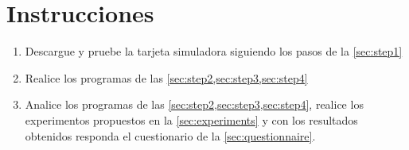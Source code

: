%
%


\section{Instrucciones}%
\label{sec:instructions}
\begin{enumerate}[noitemsep]
	\item Descargue y pruebe la tarjeta simuladora siguiendo los pasos de la \cref{sec:step1}
	\item Realice los programas de las \cref{sec:step2,sec:step3,sec:step4}
	\item Analice los programas de las \cref{sec:step2,sec:step3,sec:step4}, realice los experimentos propuestos en la \cref{sec:experiments} y con los resultados obtenidos responda el cuestionario de la \cref{sec:questionnaire}.
\end{enumerate}






